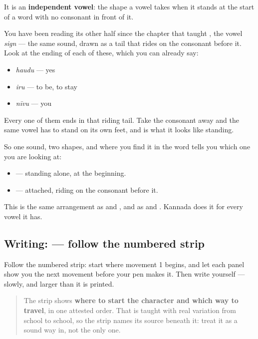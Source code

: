 It is an \textbf{independent vowel}: the shape a vowel takes when it stands at the start of a word with no consonant in front of it.

You have been reading its other half since the chapter that taught \textbf{}, the vowel \emph{sign} — the same sound, drawn as a tail that rides on the consonant before it. Look at the ending of each of these, which you can already say:

\begin{itemize}
\raggedright
  \item \textbf{} \emph{haudu} — yes
  \item \textbf{} \emph{iru} — to be, to stay
  \item \textbf{} \emph{nīvu} — you
\end{itemize}

Every one of them ends in that riding tail. Take the consonant away and the same vowel has to stand on its own feet, and \textbf{} is what it looks like standing.

So one sound, two shapes, and where you find it in the word tells you which one you are looking at:

\begin{itemize}
\raggedright
  \item \textbf{} — standing alone, at the beginning.
  \item \textbf{} — attached, riding on the consonant before it.
\end{itemize}

This is the same arrangement as \textbf{} and \textbf{}, and as \textbf{} and \textbf{}. Kannada does it for every vowel it has.

\subsection*{Writing:  — follow the numbered strip}

Follow the numbered strip: start where movement 1 begins, and let each panel show you the next movement before your pen makes it. Then write  yourself — slowly, and larger than it is printed.

\begin{quote}
The strip shows \textbf{where to start the character and which way to travel}, in one attested order. That is taught with real variation from school to school, so the strip names its source beneath it: treat it as a sound way in, not the only one.
\end{quote}

